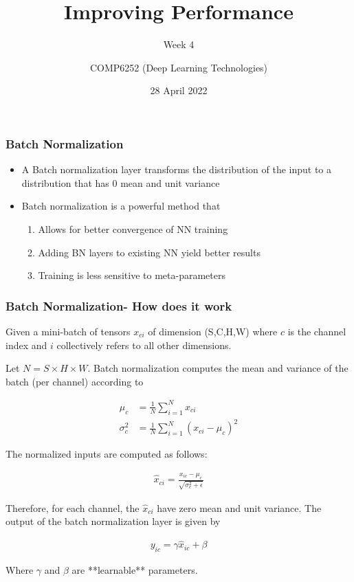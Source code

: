 \documentclass{beamer}
\begin{document}
\title{Improving Performance}
\subtitle{Week 4}
\author{COMP6252 (Deep Learning Technologies)}
 \date{28 April 2022}

\begin{frame}
    \placelogofalse %
    \titlepage
\end{frame}
    
\placelogotrue
\begin{frame}
    \frametitle{Batch Normalization}
\begin{itemize}
    \item A Batch normalization layer transforms the distribution of the input to a distribution that has 0 mean and unit variance
    \item Batch normalization is a powerful method that 
    \begin{enumerate}
        \item Allows for better convergence of NN training 
        \item Adding BN layers to existing NN yield better results
        \item Training is less sensitive to meta-parameters
    \end{enumerate}
    
\end{itemize}
    

\end{frame}
\begin{frame}
    \frametitle{Batch Normalization- How does it work}
    Given a mini-batch of tensors $x_{ci}$ of dimension (S,C,H,W) where $c$ is the channel index and $i$ collectively refers to all other dimensions. 

    Let $N=S\times H\times W$. Batch normalization computes the mean and variance of the batch (per channel) according to
    
        \begin{align*}
        \mu_c&=\frac{1}{N}\sum_{i=1}^N x_{ci}\\
        \sigma^2_c&=\frac{1}{N}\sum_{i=1}^N \left(x_{ci}-\mu_c\right)^2
        \end{align*}
    
    
    The normalized inputs are computed as follows:
    
    \begin{align*}
    \hat{x}_{ci}=\frac{x_{ic}-\mu_c}{\sqrt{\sigma^2_c+\epsilon}}
    \end{align*}
    
    
    Therefore, for each channel, the $\hat{x}_{ci}$ have zero mean and unit variance. The output of the batch normalization layer is given by
    
    \begin{align*}
    y_{ic}=\gamma \hat{x}_{ic}+\beta
    \end{align*}
    
    Where $\gamma$ and $\beta$ are **learnable** parameters.
    

\end{frame}
\end{document}

